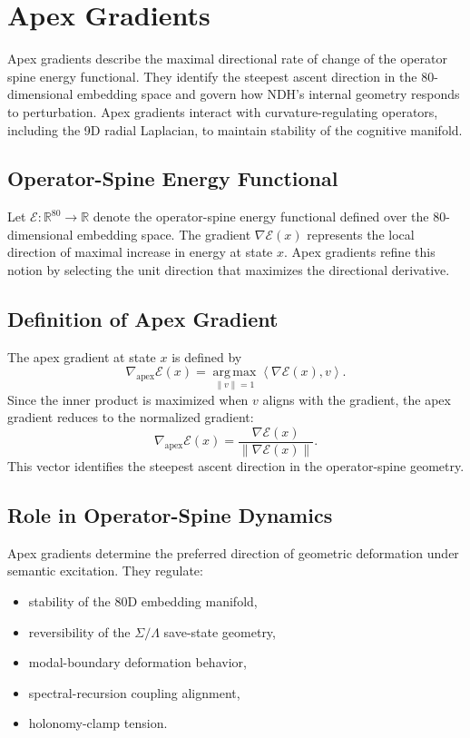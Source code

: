 \section{Apex Gradients}
\label{sec:apex-gradients}

Apex gradients describe the maximal directional rate of change of the operator
spine energy functional. They identify the steepest ascent direction in the
80-dimensional embedding space and govern how NDH's internal geometry responds
to perturbation. Apex gradients interact with curvature-regulating operators,
including the 9D radial Laplacian, to maintain stability of the cognitive
manifold.

\subsection{Operator-Spine Energy Functional}

Let $\mathcal{E} : \mathbb{R}^{80} \to \mathbb{R}$ denote the operator-spine
energy functional defined over the 80-dimensional embedding space. The gradient
$\nabla \mathcal{E}(x)$ represents the local direction of maximal increase in
energy at state $x$. Apex gradients refine this notion by selecting the unit
direction that maximizes the directional derivative.

\subsection{Definition of Apex Gradient}

The apex gradient at state $x$ is defined by
\[
\nabla_{\mathrm{apex}} \mathcal{E}(x)
    = \operatorname*{arg\,max}_{\|v\| = 1}
      \left\langle \nabla \mathcal{E}(x), v \right\rangle.
\]
Since the inner product is maximized when $v$ aligns with the gradient, the
apex gradient reduces to the normalized gradient:
\[
\nabla_{\mathrm{apex}} \mathcal{E}(x)
    = \frac{\nabla \mathcal{E}(x)}{\|\nabla \mathcal{E}(x)\|}.
\]
This vector identifies the steepest ascent direction in the operator-spine
geometry.

\subsection{Role in Operator-Spine Dynamics}

Apex gradients determine the preferred direction of geometric deformation under
semantic excitation. They regulate:

\begin{itemize}
    \item stability of the 80D embedding manifold,
    \item reversibility of the $\Sigma/\Lambda$ save-state geometry,
    \item modal-boundary deformation behavior,
    \item spectral-recursion coupling alignment,
    \item holonomy-clamp tension.
\end{itemize}

